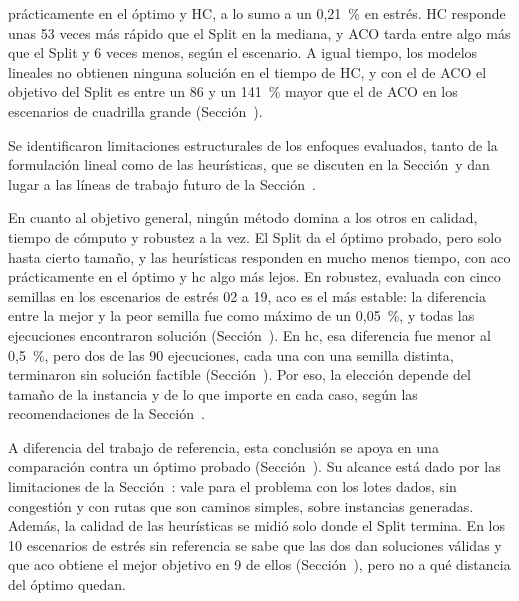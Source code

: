 	prácticamente en el óptimo y HC, a lo sumo a un 0,21~\% en estrés. HC
	responde unas 53 veces más rápido que el Split en la mediana, y ACO tarda
	entre algo más que el Split y 6 veces menos, según el escenario. A igual tiempo, los modelos lineales no obtienen ninguna solución
	en el tiempo de HC, y con el de ACO el objetivo del Split es entre un 86 y
	un 141~\% mayor que el de ACO en los escenarios de cuadrilla grande
	(Sección~).
	\item Se identificaron limitaciones estructurales de los enfoques
	evaluados, tanto de la formulación lineal como de las heurísticas, que
	se discuten en la Sección~ y dan lugar a las líneas de
	trabajo futuro de la Sección~.
\stopitemize

En cuanto al objetivo general, ningún método domina a los otros en calidad,
tiempo de cómputo y robustez a la vez. El Split da el óptimo probado, pero
solo hasta cierto tamaño, y las heurísticas responden en mucho menos tiempo,
con \ac{aco} prácticamente en el óptimo y \ac{hc} algo más lejos. En
robustez, evaluada con cinco semillas en los escenarios de estrés 02 a 19,
\ac{aco} es el más estable: la diferencia entre la mejor y la peor semilla fue
como máximo de un 0,05~\%, y todas las ejecuciones encontraron solución
(Sección~). En \ac{hc}, esa diferencia fue menor
al 0,5~\%, pero dos de las 90 ejecuciones, cada una con una semilla distinta,
terminaron sin solución factible (Sección~). Por eso, la elección depende
del tamaño de la instancia y de lo que importe en cada caso, según las
recomendaciones de la Sección~.

A diferencia del trabajo de referencia, esta conclusión se apoya en una
comparación contra un óptimo probado (Sección~). Su
alcance está dado por las limitaciones de la Sección~:
vale para el problema con los lotes dados, sin congestión y con rutas que son
caminos simples, sobre instancias generadas. Además, la calidad de las
heurísticas se midió solo donde el Split termina. En los 10 escenarios de
estrés sin referencia se sabe que las dos dan soluciones válidas y que
\ac{aco} obtiene el mejor objetivo en 9 de ellos
(Sección~), pero no a qué distancia del óptimo
quedan.

\stopsection

\startsection[title={Trabajo futuro}, reference=sec:trabajo_futuro]

